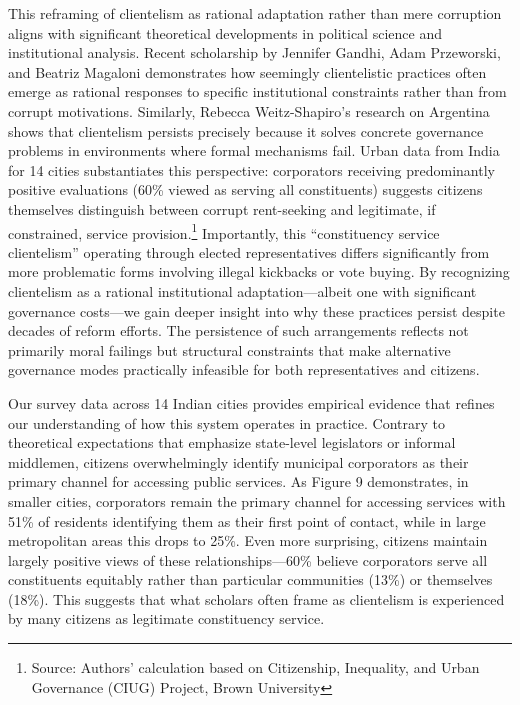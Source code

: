 This reframing of clientelism as rational adaptation rather than mere corruption aligns with significant theoretical developments in political science and institutional analysis. Recent scholarship by Jennifer Gandhi, Adam Przeworski, and Beatriz Magaloni demonstrates how seemingly clientelistic practices often emerge as rational responses to specific institutional constraints rather than from corrupt motivations. Similarly, Rebecca Weitz-Shapiro's research on Argentina shows that clientelism persists precisely because it solves concrete governance problems in environments where formal mechanisms fail. Urban data from India for 14 cities substantiates this perspective: corporators receiving predominantly positive evaluations (60\% viewed as serving all constituents) suggests citizens themselves distinguish between corrupt rent-seeking and legitimate, if constrained, service provision.\footnote{Source: Authors' calculation based on Citizenship, Inequality, and Urban Governance (CIUG) Project, Brown University} Importantly, this ``constituency service clientelism'' operating through elected representatives differs significantly from more problematic forms involving illegal kickbacks or vote buying. By recognizing clientelism as a rational institutional adaptation—albeit one with significant governance costs—we gain deeper insight into why these practices persist despite decades of reform efforts. The persistence of such arrangements reflects not primarily moral failings but structural constraints that make alternative governance modes practically infeasible for both representatives and citizens.

Our survey data across 14 Indian cities provides empirical evidence that refines our understanding of how this system operates in practice. Contrary to theoretical expectations that emphasize state-level legislators or informal middlemen, citizens overwhelmingly identify municipal corporators as their primary channel for accessing public services. As Figure 9 demonstrates, in smaller cities, corporators remain the primary channel for accessing services with 51\% of residents identifying them as their first point of contact, while in large metropolitan areas this drops to 25\%. Even more surprising, citizens maintain largely positive views of these relationships—60\% believe corporators serve all constituents equitably rather than particular communities (13\%) or themselves (18\%). This suggests that what scholars often frame as clientelism is experienced by many citizens as legitimate constituency service.

